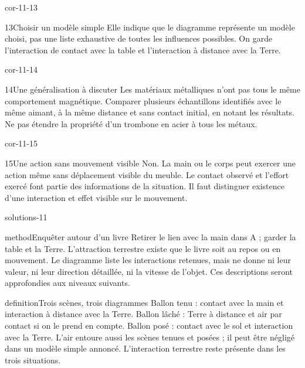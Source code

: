 \documentclass[12pt,twoside,openany]{book}
\begin{document}
\begin{blocLivre}{cor-11-13}
\begin{corrige}{13}{Choisir un modèle simple}
Elle indique que le diagramme représente un modèle choisi, pas une liste exhaustive de toutes les influences possibles. On garde l’interaction de contact avec la table et l’interaction à distance avec la Terre.\par
{}
\end{corrige}\end{blocLivre}
\begin{blocLivre}{cor-11-14}
\begin{corrige}{14}{Une généralisation à discuter}
Les matériaux métalliques n’ont pas tous le même comportement magnétique. Comparer plusieurs échantillons identifiés avec le même aimant, à la même distance et sans contact initial, en notant les résultats. Ne pas étendre la propriété d’un trombone en acier à tous les métaux.\par
\end{corrige}\end{blocLivre}
\begin{blocLivre}{cor-11-15}
\begin{corrige}{15}{Une action sans mouvement visible}
Non. La main ou le corps peut exercer une action même sans déplacement visible du meuble. Le contact observé et l’effort exercé font partie des informations de la situation. Il faut distinguer existence d’une interaction et effet visible sur le mouvement.\par
\end{corrige}\end{blocLivre}
\label{solutions-11}
\begin{pcFiche}{solutions-11}
\begin{pcEncadre}{method}{Enquêter autour d’un livre}
Retirer le lien avec la main dans A ; garder la table et la Terre. L’attraction terrestre existe que le livre soit au repos ou en mouvement. Le diagramme liste les interactions retenues, mais ne donne ni leur valeur, ni leur direction détaillée, ni la vitesse de l’objet. Ces descriptions seront approfondies aux niveaux suivants.\par
\end{pcEncadre}
\label{defi-cor-11}
\begin{pcEncadre}{definition}{Trois scènes, trois diagrammes}
Ballon tenu : contact avec la main et interaction à distance avec la Terre. Ballon lâché : Terre à distance et air par contact si on le prend en compte. Ballon posé : contact avec le sol et interaction avec la Terre. L’air entoure aussi les scènes tenues et posées ; il peut être négligé dans un modèle simple annoncé. L’interaction terrestre reste présente dans les trois situations.\par
\end{pcEncadre}
\end{pcFiche}
\end{document}
